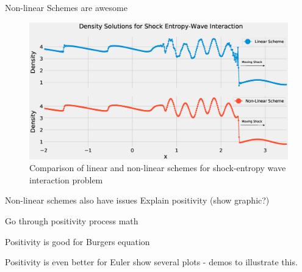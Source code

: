 \documentclass[9pt]{beamer}
\begin{document}
\begin{frame}{Non-linear Schemes are awesome}
  \begin{figure}[H]
    \centering
    \includegraphics[scale=0.25]{DensitySolutions.eps}\caption{Comparison of linear and non-linear schemes for shock-entropy wave interaction problem}
      \label{fig:ShockEntropy}
    \end{figure}
\end{frame}

\begin{frame}{Non-linear schemes also have issues}
  Explain positivity (show graphic?)
\end{frame}

\begin{frame}{Go through positivity process}
 math
\end{frame}

\begin{frame}{Positivity is good for Burgers equation}
  
\end{frame}


\begin{frame}{Positivity is even better for Euler}
  show several plots - demos to illustrate this.
\end{frame}
\end{document}

